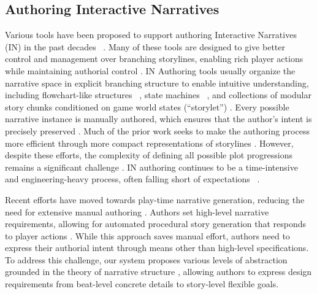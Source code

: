 

\subsection{Authoring Interactive Narratives}

 
Various tools have been proposed to support authoring Interactive Narratives (IN) in the past decades ~\cite{green2021use,green2018define,roemmele2015creative}. Many of these tools are designed to give better control and management over branching storylines, enabling rich player actions while maintaining authorial control \cite{friedhoff2013untangling}. IN Authoring tools usually organize the narrative space in explicit branching structure  \cite{chen2022does} to enable intuitive understanding, including flowchart-like structures ~\cite{friedhoff2013untangling}, state machines ~\cite{green2020towards,syahputra2019historical}, and collections of modular story chunks conditioned on game world states (``storylet'') \cite{kreminski2018sketching}. 
\color{black}
Every possible narrative instance is manually authored, which ensures that the author’s intent is precisely preserved \cite{riedl2013interactive}. Much of the prior work 
seeks to make the authoring process more efficient through more compact representations of storylines \cite{scigajlo2023generation}. However, despite these efforts, the complexity of defining all possible plot progressions remains a significant challenge \cite{riedl2013interactive}. IN authoring continues to be a time-intensive and engineering-heavy process, often falling short of expectations ~\cite{green2021use,spierling2009authoring}.

Recent efforts have moved towards play-time narrative generation, reducing the need for extensive manual authoring \cite{freiknecht2020procedural, garbe2019storyassembler}. Authors set high-level narrative requirements, allowing for automated procedural story generation that responds to player actions \cite{riedl2006linear}. While this approach saves manual effort, 
authors need to express their authorial intent through means other than high-level specifications. To address this challenge, our system proposes various levels of abstraction grounded in the theory of narrative structure \cite{mckee1997story}, allowing authors to express design requirements from beat-level concrete details to story-level flexible goals.

